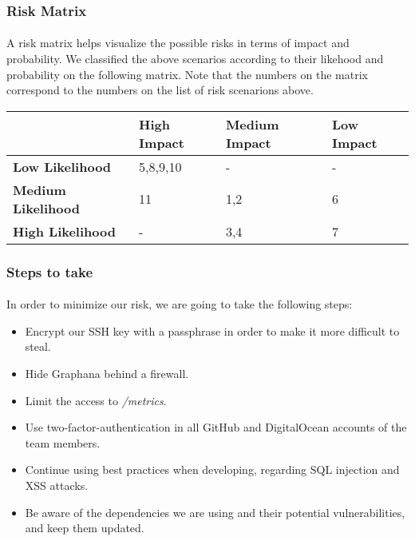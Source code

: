 \subsubsection{Risk Matrix}
\paragraph{} A risk matrix helps visualize the possible risks in terms of impact and probability. We classified the above scenarios according to their likehood and probability on the following matrix. Note that the numbers on the matrix correspond to the numbers on the list of risk scenarions above. \\
\begin{tabular}{|l|l|l|l|}
	\hline
	                           & \textbf{High Impact} & \textbf{Medium Impact} & \textbf{Low Impact} \\ \hline
	\textbf{Low Likelihood}    & 5,8,9,10             & -                      & -                   \\ \hline
	\textbf{Medium Likelihood} & 11                   & 1,2                    & 6                   \\ \hline
	\textbf{High Likelihood}   & -                    & 3,4                    & 7                   \\ \hline
\end{tabular}

\subsubsection{Steps to take}
\paragraph{} In order to minimize our risk, we are going to take the following steps:
\begin{itemize}
	\item Encrypt our SSH key with a passphrase in order to make it more difficult to steal.
	\item Hide Graphana behind a firewall.
	\item Limit the access to \textit{/metrics}.
	\item Use two-factor-authentication in all GitHub and DigitalOcean accounts of the team members.
	\item Continue using best practices when developing, regarding SQL injection and XSS attacks.
	\item Be aware of the dependencies we are using and their potential vulnerabilities, and keep them updated.
\end{itemize}

